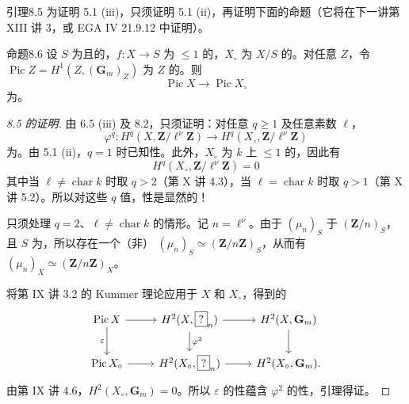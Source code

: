 \begin{SGAresult}{引理}{8.5}
为证明 5.1 (iii)，只须证明 5.1 (ii)，再证明下面的命题（它将在下一讲第 XIII 讲 3，或 EGA IV 21.9.12 中证明）。
\end{SGAresult}
\begin{SGAresult}{命题}{8.6}
设 $S$ 为且的，$f:X\to S$ 为 $\leq1$ 的，$X_\circ$ 为 $X/S$ 的。对任意 $Z$，令 $\operatorname{Pic}Z=H^1(Z,(\mathbf G_m)_Z)$ 为 $Z$ 的。则
\[
\operatorname{Pic}X\longrightarrow\operatorname{Pic}X_\circ
\]
为。
\end{SGAresult}

\begin{proof}[8.5 的证明]
由 6.5 (iii) 及 8.2，只须证明：对任意 $q\geq1$ 及任意素数 $\ell$，
\[
\varphi^q:H^q(X,\mathbf Z/\ell^\nu\mathbf Z)\longrightarrow
H^q(X_\circ,\mathbf Z/\ell^\nu\mathbf Z)
\]
为。由 5.1 (ii)，$q=1$ 时已知性。此外，$X_\circ$ 为 $k$ 上 $\leq1$ 的，因此有
\[
H^q(X_\circ,\mathbf Z/\ell^\nu\mathbf Z)=0
\]
其中当 $\ell\neq\operatorname{char}k$ 时取 $q>2$（第 X 讲 4.3），当 $\ell=\operatorname{char}k$ 时取 $q>1$（第 X 讲 5.2）。所以对这些 $q$ 值，性是显然的！

只须处理 $q=2$、$\ell\neq\operatorname{char}k$ 的情形。记 $n=\ell^\nu$。由于 $(\mu_n)_S$ 于 $(\mathbf Z/n)_S$，且 $S$ 为，所以存在一个（非） $(\mu_n)_S\simeq(\mathbf Z/n\mathbf Z)_S$，从而有 $(\mu_n)_X\simeq(\mathbf Z/n\mathbf Z)_X$。

将第 IX 讲 3.2 的 Kummer 理论应用于 $X$ 和 $X_\circ$，得到的
\[
\begin{tikzcd}
\operatorname{Pic}X\arrow[r]\arrow[d,"\varepsilon"']&H^2(X,\boxed{?}_n)\arrow[r]\arrow[d,"\varphi^2"]&H^2(X,\mathbf G_m)\arrow[d]\\
\operatorname{Pic}X_\circ\arrow[r]&H^2(X_\circ,\boxed{?}_n)\arrow[r]&H^2(X_\circ,\mathbf G_m).
\end{tikzcd}
\]
由第 IX 讲 4.6，$H^2(X_\circ,\mathbf G_m)=0$。所以 $\varepsilon$ 的性蕴含 $\varphi^2$ 的性，引理得证。
\end{proof}

